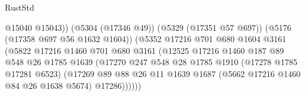 \begin{lexlean}{RustStd}
\begin{coremodule}
                                                    @15040
                                                    @15043))
                                                (@5304 (@17346 @49))
                                                (@5329 (@17351 @57 @697))
                                                (@5176 (@17358 @697 @56 @1632 @1604))
                                                (@5352
                                                  @17216
                                                  @701
                                                  @680
                                                  @1604
                                                  @3161
                                                  (@5822
                                                    @17216
                                                    @1460
                                                    @701
                                                    @680
                                                    @3161
                                                    (@12525
                                                      @17216
                                                      @1460
                                                      @187
                                                      @89
                                                      @548
                                                      @26
                                                      @1785
                                                      @1639
                                                      (@17270
                                                        @247
                                                        @548
                                                        @28
                                                        @1785
                                                        @1910
                                                        (@17278 @1785 @17281 @6523)
                                                        (@17269
                                                          @89
                                                          @88
                                                          @26
                                                          @11
                                                          @1639
                                                          @1687
                                                          (@5662 @17216 @1460 @84 @26 @1638 @5674)
                                                          @17286))))))

\end{coremodule}
\end{lexlean}
